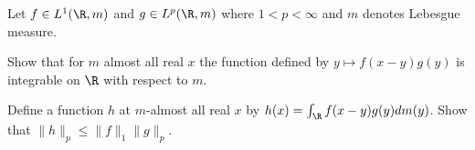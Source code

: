 Let $f\in L^1(\R,m)$ and $g\in L^p(\R,m)$ where $1<p<\infty$ and $m$
denotes Lebesgue measure.
\begin{alist}
\item Show that for $m$ almost all real $x$ the function defined by
$y\mapsto f(x-y)g(y)$ is integrable on $\R$ with respect to $m$.
\item Define a function $h$ at $m$-almost all real $x$ by
$h(x)=\int_{\R}f(x-y)g(y)dm(y)$. Show that $\|h\|_p\leq
\|f\|_1\|g\|_p$.
\end{alist}
